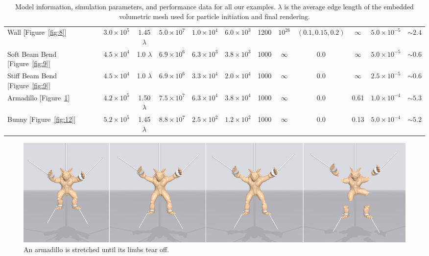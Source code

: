 \begin{table}[htb]
{\begin{tabular}{lccccccccccc}
  Wall [Figure~\ref{fig:8}]                & $3.0\times10^5$ & 1.45$\lambda$ & $5.0\times10^7$ & $1.0\times10^{4}$ & $6.0\times10^{3}$        & 1200 & $10^{26}$ &$(0.1,0.15,0.2)$ &$\infty$  & $5.0\times10^{-5}$   & $\sim2.4$ \\
  Soft Beam Bend [Figure~\ref{fig:9}]      & $4.5\times10^4$ & 1.0 $\lambda$ & $6.9\times10^6$ & $6.3\times10^3$   & $3.8\times10^3$          & 1000 & $\infty $ & 0.0             & $\infty$ & $5.0\times10^{-5}$   & $\sim0.6$ \\
  Stiff Beam Bend [Figure~\ref{fig:9}]     & $4.5\times10^4$ & 1.0 $\lambda$ & $6.9\times10^6$ & $3.3\times10^4$   & $2.0\times10^4$          & 1000 & $\infty $ & 0.0             & $\infty$ & $2.5\times10^{-5}$ & $\sim0.6$ \\
  Armadillo [Figure~\ref{fig:10}]          & $4.2\times10^5$ & 1.50$\lambda$ & $7.5\times10^7$ & $6.3\times10^4$   & $3.8\times10^4$          & 1000 & $\infty $ & 0.0             & 0.61     & $1.0\times10^{-4}$          & $\sim5.3$ \\
  Bunny [Figure~\ref{fig:12}]              & $5.2\times10^5$ & 1.45$\lambda$ & $8.8\times10^7$ & $2.5\times10^2$   & $1.2\times10^2$          & 1000 & $\infty $ & 0.0             & 0.13     & $5.0\times10^{-4}$          & $\sim5.2$ \\
  \hline
\end{tabular}
}
\label{tab:1}
\caption{Model information, simulation parameters, and performance data for all our examples. $\lambda$ is the average edge length of the embedded volumetric mesh used for particle initiation and final rendering.}
\end{table}

\begin{figure}[t]
  \centering
  \includegraphics[width=\linewidth]{./figs/demo_tear_armadillo.png}
  \caption{\label{fig:10}
  An armadillo is stretched until its limbs tear off.
}
\end{figure}


